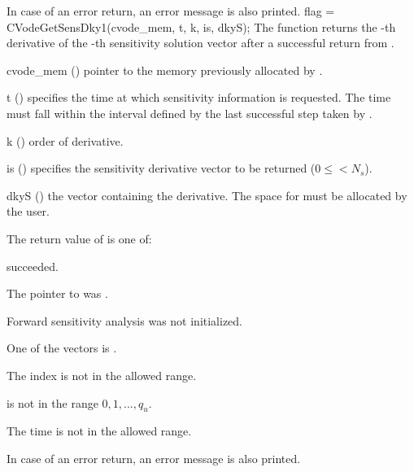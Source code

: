 {
  In case of an error return, an error message is also printed.  
}
{
  flag = CVodeGetSensDky1(cvode\_mem, t, k, is, dkyS);
}
{
  The function  returns the -th derivative of the 
  -th sensitivity solution vector after a successful return from .
}
{
  \begin{args}
  \item[cvode\_mem] ()
    pointer to the memory previously allocated by .
  \item[t] ()
    specifies the time at which sensitivity information is 
    requested. The time  must fall within the interval defined by the last 
    successful step taken by {\cvodes}.
  \item[k] () order of derivative.
  \item[is] () specifies the sensitivity derivative vector to be returned
    ($0\le$$< N_s$).
  \item[dkyS] ()
    the vector containing the derivative. The space for  must be allocated by 
    the user. 
  \end{args}
}
{
  The return value  of  is one of:
  \begin{args}
  \item[\Id{CV\_SUCCESS}] 
     succeeded.
  \item[\Id{CV\_MEM\_NULL}] 
    The pointer to  was .
  \item[\Id{CV\_NO\_SENS}] 
    Forward sensitivity analysis was not initialized.
  \item[\Id{CV\_BAD\_DKY}] 
    One of the vectors  is .
  \item[\Id{CV\_BAD\_IS}]
    The index  is not in the allowed range.
  \item[\Id{CV\_BAD\_K}] 
     is not in the range $0, 1, ..., q_u$.
  \item[\Id{CV\_BAD\_T}] 
    The time  is not in the allowed range.
  \end{args}
}
{
  In case of an error return, an error message is also printed.  
}

